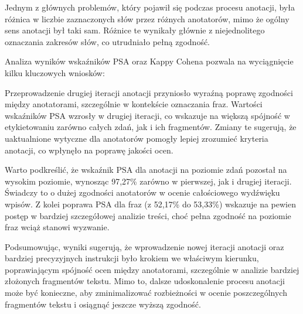 \documentclass[12pt]{article}
\begin{document}
Jednym z głównych problemów, który pojawił się podczas procesu anotacji, była różnica w liczbie zaznaczonych słów przez różnych anotatorów, mimo że ogólny sens anotacji był taki sam. Różnice te wynikały głównie z niejednolitego oznaczania zakresów słów, co utrudniało pełną zgodność.

Analiza wyników wskaźników PSA oraz Kappy Cohena pozwala na wyciągnięcie kilku kluczowych wniosków:

Przeprowadzenie drugiej iteracji anotacji przyniosło wyraźną poprawę zgodności między anotatorami, szczególnie w kontekście oznaczania fraz. Wartości wskaźników PSA wzrosły w drugiej iteracji, co wskazuje na większą spójność w etykietowaniu zarówno całych zdań, jak i ich fragmentów. Zmiany te sugerują, że uaktualnione wytyczne dla anotatorów pomogły lepiej zrozumieć kryteria anotacji, co wpłynęło na poprawę jakości ocen.

Warto podkreślić, że wskaźnik PSA dla anotacji na poziomie zdań pozostał na wysokim poziomie, wynosząc 97,27\% zarówno w pierwszej, jak i drugiej iteracji. Świadczy to o dużej zgodności anotatorów w ocenie całościowego wydźwięku wpisów. Z kolei poprawa PSA dla fraz (z 52,17\% do 53,33\%) wskazuje na pewien postęp w bardziej szczegółowej analizie treści, choć pełna zgodność na poziomie fraz wciąż stanowi wyzwanie.

Podsumowując, wyniki sugerują, że wprowadzenie nowej iteracji anotacji oraz bardziej precyzyjnych instrukcji było krokiem we właściwym kierunku, poprawiającym spójność ocen między anotatorami, szczególnie w analizie bardziej złożonych fragmentów tekstu. Mimo to, dalsze udoskonalenie procesu anotacji może być konieczne, aby zminimalizować rozbieżności w ocenie poszczególnych fragmentów tekstu i osiągnąć jeszcze wyższą zgodność.
\end{document}
